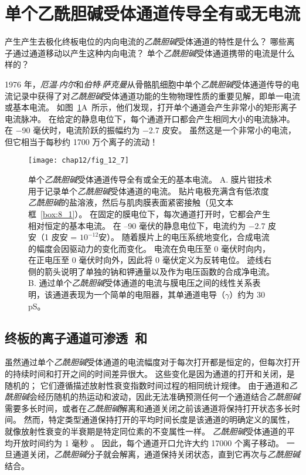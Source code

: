 \section{单个乙酰胆碱受体通道传导全有或无电流}

产生产生去极化终板电位的内向电流的\textit{乙酰胆碱}受体通道的特性是什么？
哪些离子通过通道移动以产生这种内向电流？
单个\textit{乙酰胆碱}受体通道携带的电流是什么样的？


1976 年，\textit{厄温$\cdot$内尔}和\textit{伯特$\cdot$萨克曼}从骨骼肌细胞中单个\textit{乙酰胆碱}受体通道传导的电流记录中获得了对\textit{乙酰胆碱}受体通道功能的生物物理性质的重要见解，即单一电流或基本电流。
如图~\ref{fig:12_7}A~所示，他们发现，打开单个通道会产生非常小的矩形离子电流脉冲。
在给定的静息电位下，每个通道开口都会产生相同大小的电流脉冲。
在 −90 毫伏时，电流阶跃的振幅约为 −2.7 皮安。 
虽然这是一个非常小的电流，但它相当于每秒约 1700 万个离子的流动！


\begin{figure}[htbp]
	\centering
	\texttt{[image: chap12/fig\_12\_7]}
	\caption{单个\textit{乙酰胆碱}受体通道传导全有或全无的基本电流。
		A. 膜片钳技术用于记录单个\textit{乙酰胆碱}受体通道的电流。
		贴片电极充满含有低浓度\textit{乙酰胆碱}的盐溶液，然后与肌肉膜表面紧密接触（见文本框~\ref{box:8_1}）。
		在固定的膜电位下，每次通道打开时，它都会产生相对恒定的基本电流。
		在 –90 毫伏的静息电位下，电流约为 −2.7 皮安（1 皮安 = $10^{-12}$安）。
		随着膜片上的电压系统地变化，合成电流的幅度会因驱动力的变化而变化。
		电流在负电压至 0 毫伏时向内，在正电压至 0 毫伏时向外，因此将 0 毫伏定义为反转电位。
		迹线右侧的箭头说明了单独的钠和钾通量以及作为电压函数的合成净电流。
		B. 通过单个\textit{乙酰胆碱}受体通道的电流与膜电压之间的线性关系表明，该通道表现为一个简单的电阻器，其单通道电导（$\gamma$）约为 30 pS。}
	\label{fig:12_7}
\end{figure}



\subsection{终板的离子通道可渗透~和~}

虽然通过单个\textit{乙酰胆碱}受体通道的电流幅度对于每次打开都是恒定的，但每次打开的持续时间和打开之间的时间差异很大。
这些变化是因为通道的打开和关闭，是随机的；
它们遵循描述放射性衰变指数时间过程的相同统计规律。 
由于通道和\textit{乙酰胆碱}会经历随机的热运动和波动，因此无法准确预测任何一个通道结合\textit{乙酰胆碱}需要多长时间，或者在\textit{乙酰胆碱}解离和通道关闭之前该通道将保持打开状态多长时间。
然而，特定类型通道保持打开的平均时间长度是该通道的明确定义的属性，就像放射性衰变的半衰期是特定同位素的不变属性一样。
\textit{乙酰胆碱}受体通道的平均开放时间约为 1 毫秒 。
因此，每个通道开口允许大约 17000 个离子移动。
一旦通道关闭，\textit{乙酰胆碱}分子就会解离，通道保持关闭状态，直到它再次与\textit{乙酰胆碱}结合。


